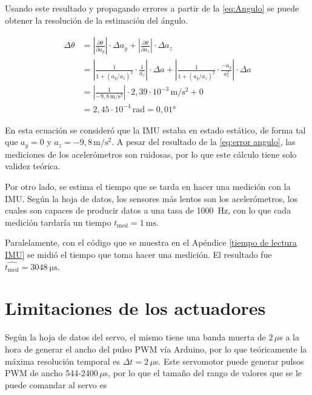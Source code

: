 \documentclass[a4paper,12pt]{article}
\begin{document}
Usando este resultado y propagando errores a partir de la \autoref{eq:Angulo} se puede obtener la resolución de la estimación del ángulo. 

\begin{equation}
\label{eq:error angulo}
\begin{split}
\Delta \theta 
&= \left|\frac{\partial \theta}{\partial a_y}\right|\cdot \Delta a_y + \left|\frac{\partial \theta}{\partial a_z}\right|\cdot \Delta a_z \\
&= \left|\frac{1}{1 + (a_y / a_z)^2}\cdot \frac{1}{a_z}\right|\cdot \Delta a 
+ \left|\frac{1}{1 + (a_y/a_z)^2} \cdot \frac{-a_y}{a_z^2}\right| \cdot \Delta a \\
&= \left|\frac{1}{-9,8\, \mathrm{m/s^2}}\right|\cdot 2,39 \cdot 10^{-3}\, \mathrm{m/s^2} + 0 \\
&= 2,45 \cdot 10^{-4}\, \mathrm{rad} = 0,01 \text{°}
\end{split}
\end{equation}

En esta ecuación se consideró que la IMU estaba en estado estático, de forma tal que $a_y = 0$ y $a_z = -9,8 \, \mathrm{m/s^2}$.  A pesar del resultado de la \autoref{eq:error angulo}, las mediciones de los acelerómetros son ruidosas, por lo que este cálculo tiene solo validez teórica. 

Por otro lado, se estima el tiempo que se tarda en hacer una medición con la IMU. Según la hoja de datos, los sensores más lentos son los acelerómetros, los cuales son capaces de producir datos a una tasa de \SI{1000}{Hz}, con lo que cada medición tardaría un tiempo $t_\text{med} = \SI{1}{\ms}$. 

Paralelamente, con el código que se muestra en el Apéndice \ref{tiempo de lectura IMU} se midió el tiempo que toma hacer una medición. El resultado fue $\widehat{t_\text{med}} = \SI{3048}{\us}$.

\section{Limitaciones de los actuadores}

Según la hoja de datos del servo, el mismo tiene una banda muerta de $2\,\mu$s a la hora de generar el ancho del pulso PWM vía Arduino, por lo que teóricamente la máxima resolución temporal es $\Delta t = 2 \, \mu$s. Este servomotor puede generar pulsos PWM de ancho 544-2400$\,\mu$s, por lo que el tamaño del rango de valores que se
le puede comandar al servo es 
\end{document}
